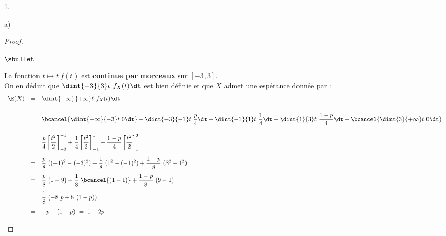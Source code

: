 \documentclass[11pt]{article}%
\begin{document}
\begin{noliste}{1.}
\begin{noliste}{a)}
\begin{proof}
\begin{noliste}{$\sbullet$}
      \item La fonction $t \mapsto t \ f(t)$ est {\bf continue par
          morceaux} sur $[-3, 3]$.\\
        On en déduit que $\dint{-3}{3} t \ f_X(t) \dt$ est bien
        définie et que $X$ admet une espérance donnée par :
        \[
        \begin{array}{rcl}
          \E(X) %
          & = & \dint{-\infty}{+\infty} t \ f_X(t) \dt \\[.6cm]
          & = & \bcancel{\dint{-\infty}{-3} t \ 0 \dt} +
          \dint{-3}{-1}t\ \dfrac{p}{4}\dt + \dint{-1}{1}t\
          \dfrac{1}{4}\dt + \dint{1}{3}t\ \dfrac{1-p}{4}\dt +
          \bcancel{\dint{3}{+\infty} t \ 0 \dt} \\[.6cm]
          & = & \dfrac{p}{4}\left[ \dfrac{t^2}{2} \right]_{-3}^{-1}
          +\dfrac{1}{4}\left[ \dfrac{t^2}{2} \right]_{-1}^{1}
          +\dfrac{1-p}{4}\left[ \dfrac{t^2}{2} \right]_{1}^{3}
          \\[.6cm]
          & = & \dfrac{p}{8} \ ((-1)^2 - (-3)^2) + \dfrac{1}{8} \
          (1^2 - (-1)^2) + \dfrac{1-p}{8} \ (3^2 - 1^2) \\[.4cm]
          & = & \dfrac{p}{8} \ (1 - 9) + \dfrac{1}{8} \
          \bcancel{(1 - 1)} + \dfrac{1-p}{8} \ (9 - 1) 
          \\[.4cm]
          & = & \dfrac{1}{8} \ (-8 \ p + 8 \ (1-p))
          \\[.4cm]
          & = & -p + (1-p) \ = \ 1-2p
        \end{array}
        \]
        

\end{noliste}
\end{proof}
\end{noliste}
\end{noliste}
\end{document}
